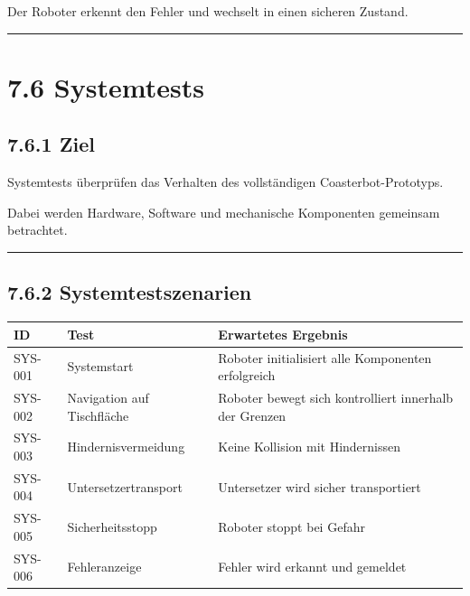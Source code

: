 \documentclass[
  a4paper,
  12pt,
  DIV=12,        %
  parskip=half,  %
  headings=small %
]{scrartcl}
\theoremstyle{definition}
\theoremstyle{definition}
\begin{document}
Der Roboter erkennt den Fehler und wechselt in einen sicheren Zustand.

\begin{center}\rule{0.5\linewidth}{0.5pt}\end{center}

\section{7.6 Systemtests}\label{systemtests-1}

\subsection{7.6.1 Ziel}\label{ziel-3}

Systemtests überprüfen das Verhalten des vollständigen
Coasterbot-Prototyps.

Dabei werden Hardware, Software und mechanische Komponenten gemeinsam
betrachtet.

\begin{center}\rule{0.5\linewidth}{0.5pt}\end{center}

\subsection{7.6.2 Systemtestszenarien}\label{systemtestszenarien}

\begin{longtable}[]{@{}
  >{\raggedright\arraybackslash}p{}
  >{\raggedright\arraybackslash}p{}
  >{\raggedright\arraybackslash}p{}@{}}
\toprule\noalign{}
\begin{minipage}[b]{\linewidth}\raggedright
ID
\end{minipage} & \begin{minipage}[b]{\linewidth}\raggedright
Test
\end{minipage} & \begin{minipage}[b]{\linewidth}\raggedright
Erwartetes Ergebnis
\end{minipage} \\
\midrule\noalign{}
\endhead
\bottomrule\noalign{}
\endlastfoot
SYS-001 & Systemstart & Roboter initialisiert alle Komponenten
erfolgreich \\
SYS-002 & Navigation auf Tischfläche & Roboter bewegt sich kontrolliert
innerhalb der Grenzen \\
SYS-003 & Hindernisvermeidung & Keine Kollision mit Hindernissen \\
SYS-004 & Untersetzertransport & Untersetzer wird sicher
transportiert \\
SYS-005 & Sicherheitsstopp & Roboter stoppt bei Gefahr \\
SYS-006 & Fehleranzeige & Fehler wird erkannt und gemeldet \\
\end{longtable}
\end{document}
